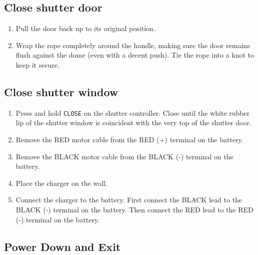 \documentclass{article}
\begin{document}
	\subsection{Close shutter door}
		
		\begin{enumerate}
			
			\item Pull the door back up to its original position.
			
			\item Wrap the rope completely around the handle, making sure the door remains flush against the dome (even with a decent push). Tie the rope into a knot to keep it secure.
			
		\end{enumerate}
		
	\subsection{Close shutter window}
		
		\begin{enumerate}
			
			\item Press and hold \texttt{CLOSE} on the shutter controller. Close until the white rubber lip of the shutter window is coincident with the very top of the shutter door.
			
			\item Remove the RED motor cable from the RED (+) terminal on the battery.
			
			\item Remove the BLACK motor cable from the BLACK (-) terminal on the battery.
			
			\item Place the charger on the wall.
			
			\item Connect the charger to the battery. First connect the BLACK lead to the BLACK (-) terminal on the battery. Then connect the RED lead to the RED (-) terminal on the battery.
			
		\end{enumerate}
		
	\subsection{Power Down and Exit}
	
\end{document}
